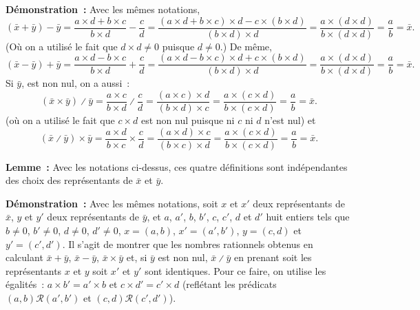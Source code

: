 \medskip

\noindent\textbf{Démonstration :} Avec les mêmes notations, 
\begin{equation*}
    (\bar{x} + \bar{y}) - \bar{y} 
        = \frac{a \times d + b \times c}{b \times d} - \frac{c}{d}
        = \frac{(a \times d + b \times c) \times d - c \times (b \times d)}{(b \times d) \times d}
        = \frac{a \times (d \times d)}{b \times (d \times d)}
        = \frac{a}{b} 
        = \bar{x}.
\end{equation*}
(Où on a utilisé le fait que $d \times d \neq 0$ puisque $d \neq 0$.)
De même, 
\begin{equation*}
    (\bar{x} - \bar{y}) + \bar{y} 
        = \frac{a \times d - b \times c}{b \times d} + \frac{c}{d}
        = \frac{(a \times d - b \times c) \times d + c \times (b \times d)}{(b \times d) \times d}
        = \frac{a \times (d \times d)}{b \times (d \times d)}
        = \frac{a}{b} 
        = \bar{x} .
\end{equation*}
Si $\bar{y}$, est non nul, on a aussi : 
\begin{equation*}
    (\bar{x} \times \bar{y}) \divslash \bar{y} 
        = \frac{a \times c}{b \times d} \divslash \frac{c}{d}
        = \frac{(a \times c) \times d}{(b \times d) \times c} 
        = \frac{a \times (c \times d)}{b \times (c \times d)} 
        = \frac{a}{b}
        = \bar{x}.
\end{equation*}
(où on a utilisé le fait que $c \times d$ est non nul puisque ni $c$ ni $d$ n'est nul)
et
\begin{equation*}
    (\bar{x} \divslash \bar{y}) \times \bar{y} 
        = \frac{a \times d}{b \times c} \times \frac{c}{d}
        = \frac{(a \times d) \times c}{(b \times c) \times d}
        = \frac{a \times (c \times d)}{b \times (c \times d)} 
        = \frac{a}{b}
        = \bar{x}.
\end{equation*}

\done

\medskip

\noindent\textbf{Lemme :} Avec les notations ci-dessus, ces quatre définitions sont indépendantes des choix des représentants de $\bar{x}$ et $\bar{y}$.

\medskip

\noindent\textbf{Démonstration :} Avec les mêmes notations, soit $x$ et $x'$ deux représentants de $\bar{x}$, $y$ et $y'$ deux représentants de $\bar{y}$, et $a$, $a'$, $b$, $b'$, $c$, $c'$, $d$ et $d'$ huit entiers tels que $b \neq 0$, $b' \neq 0$, $d \neq 0$, $d' \neq 0$, $x = (a, b)$, $x' = (a', b')$, $y = (c, d)$ et $y' = (c', d')$. 
Il s'agit de montrer que les nombres rationnels obtenus en calculant $\bar{x} + \bar{y}$, $\bar{x} - \bar{y}$, $\bar{x} \times \bar{y}$ et, si $\bar{y}$ est non nul, $\bar{x} \divslash \bar{y}$ en prenant soit les représentants $x$ et $y$ soit $x'$ et $y'$ sont identiques.
Pour ce faire, on utilise les égalités : $a \times b' = a' \times b$ et $c \times d' = c' \times d$ (reflétant les prédicats $(a, b) \mathrel{\mathcal{R}} (a', b')$ et $(c, d) \mathrel{\mathcal{R}} (c', d')$). 

